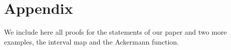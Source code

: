 \section{Appendix}
We include here all proofs for the statements of our paper and two more examples,
the interval map and the Ackermann function.





